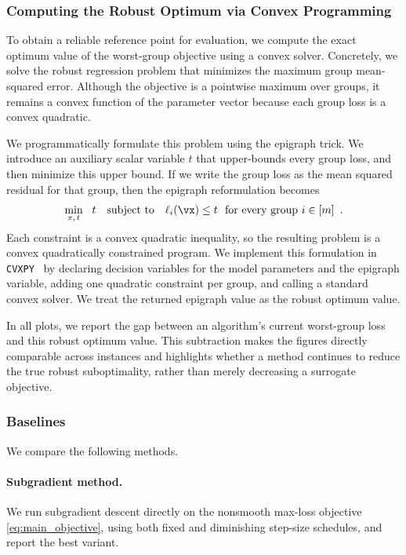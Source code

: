 \subsubsection{Computing the Robust Optimum via Convex Programming}
To obtain a reliable reference point for evaluation, we compute the exact optimum value of the worst-group objective using a convex solver. Concretely, we solve the robust regression problem that minimizes the maximum group mean-squared error. Although the objective is a pointwise maximum over groups, it remains a convex function of the parameter vector because each group loss is a convex quadratic.

We programmatically formulate this problem using the epigraph trick. We introduce an auxiliary scalar variable $t$ that upper-bounds every group loss, and then minimize this upper bound. If we write the group loss as the mean squared residual for that group, then the epigraph reformulation becomes
\[
\min_{x,\, t}\ \ t
\quad\text{subject to}\quad
\ell_i(\vx) \le t
\ \ \text{for every group } i\in[m]\enspace.
\]
Each constraint is a convex quadratic inequality, so the resulting problem is a convex quadratically constrained program. We implement this formulation in \texttt{CVXPY}~\citep{diamond2016cvxpy,agrawal2018rewriting} by declaring decision variables for the model parameters and the epigraph variable, adding one quadratic constraint per group, and calling a standard convex solver. We treat the returned epigraph value as the robust optimum value.

In all plots, we report the gap between an algorithm's current worst-group loss and this robust optimum value. This subtraction makes the figures directly comparable across instances and highlights whether a method continues to reduce the true robust suboptimality, rather than merely decreasing a surrogate objective.
\subsubsection{Baselines}

We compare the following methods.

\paragraph{Subgradient method.}
We run subgradient descent directly on the nonsmooth max-loss objective \ref{eq:main_objective}, using both fixed and diminishing step-size schedules, and report the best variant.

